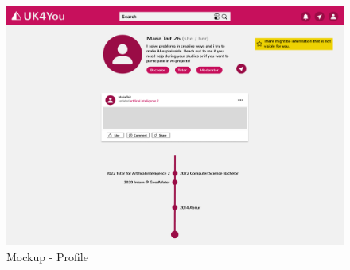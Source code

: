 \begin{figure}[ht]
    \centering
    \includegraphics[width=1\columnwidth]{figures/profile.pdf}
    \caption{\label{fig:profile} Mockup - Profile}
\end{figure}
